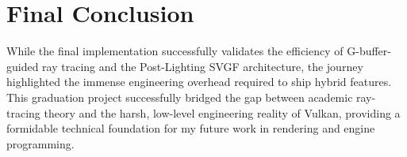 \documentclass[12pt,a4paper]{report}
\begin{document}
\section{Final Conclusion}
While the final implementation successfully validates the efficiency of G-buffer-guided ray tracing and the Post-Lighting SVGF architecture, the journey highlighted the immense engineering overhead required to ship hybrid features.
This graduation project successfully bridged the gap between academic ray-tracing theory and the harsh, low-level engineering reality of Vulkan, providing a formidable technical foundation for my future work in rendering and engine programming.

 

\end{document}
